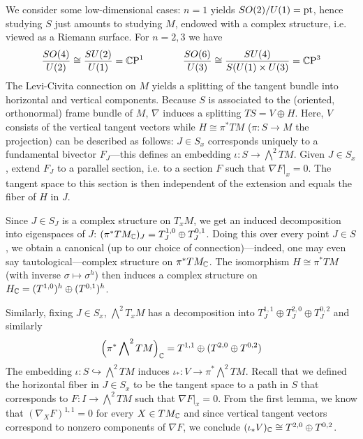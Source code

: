 \documentclass{scrartcl}
\begin{document}
We consider some low-dimensional cases: $n=1$ yields $SO(2)/U(1)=\mathrm{pt}$, hence studying $S$ just amounts to studying $M$, endowed with a complex structure, i.e. viewed as a Riemann surface. For $n=2,3$ we have
\begin{equation*}
\frac{SO(4)}{U(2)}\cong \frac{SU(2)}{U(1)}=\mathbb{C}\mathrm{P}^1 \qquad \qquad 
\frac{SO(6)}{U(3)}\cong \frac{SU(4)}{S(U(1)\times U(3)}=\mathbb{C}\mathrm{P}^3
\end{equation*}
The Levi-Civita connection on $M$ yields a splitting of the tangent bundle into horizontal and vertical components. Because $S$ is associated to the (oriented, orthonormal) frame bundle of $M$, $\nabla$ induces a splitting $TS=V\oplus H$. Here, $V$ consists of the vertical tangent vectors while $H\cong \pi^*TM$ ($\pi:S\to M$ the projection) can be described as follows: $J\in S_x$ corresponds uniquely to a fundamental bivector $F_J$---this defines an embedding $\iota:S\to \bigwedge^2 TM$. Given $J\in S_x$, extend $F_J$ to a parallel section, i.e. to a section $F$ such that $\nabla F|_x=0$. The tangent space to this section is then independent of the extension and equals the fiber of $H$ in $J$.

\medskip

Since $J\in S_J$ is a complex structure on $T_x M$, we get an induced decomposition into eigenspaces of $J$: $(\pi^*TM_{\mathbb{C}})_J=T^{1,0}_J\oplus T^{0,1}_J$. Doing this over every point $J\in S$, we obtain a canonical (up to our choice of connection)---indeed, one may even say tautological---complex structure on $\pi^*TM_{\mathbb{C}}$. The isomorphism $H\cong \pi^* TM$ (with inverse $\sigma\mapsto \sigma^h$) then induces a complex structure on $H_{\mathbb{C}}=(T^{1,0})^h\oplus (T^{0,1})^h$.

\medskip

Similarly, fixing $J\in S_x$, $\bigwedge^2 T_xM$ has a decomposition into $T_J^{1,1}\oplus T_J^{2,0}\oplus T_J^{0,2}$ and similarly 
\begin{equation*}
\Big(\pi^*\bigwedge\nolimits^2 TM\Big)_{\mathbb{C}}=T^{1,1}\oplus (T^{2,0}\oplus T^{0,2})
\end{equation*}
The embedding $\iota: S\hookrightarrow \bigwedge^2 TM$ induces  $\iota_*:V\to \pi^*\bigwedge^2 TM$. Recall that we defined the horizontal fiber in $J\in S_x$ to be the tangent space to a path in $S$ that corresponds to $F:I\to \bigwedge^2 TM$ such that $\nabla F|_x=0$. From the first lemma, we know that $(\nabla_X F)^{1,1}=0$ for every $X\in TM_{\mathbb{C}}$ and since vertical tangent vectors correspond to nonzero components of $\nabla F$, we conclude $(\iota_*V)_{\mathbb{C}}\cong T^{2,0}\oplus T^{0,2}$.
\end{document}
